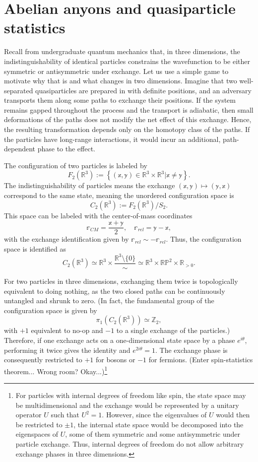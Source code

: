\documentclass{article}
\begin{document}
\section{Abelian anyons and quasiparticle statistics}
Recall from undergraduate quantum mechanics that, in three dimensions,
the indistinguishability of identical particles constrains the wavefunction
to be either symmetric or antisymmetric under exchange.
Let us use a simple game to motivate why that is and what changes in two dimensions.
Imagine that two well-separated quasiparticles are prepared in with definite positions,
and an adversary transports them along some paths to exchange their positions.
If the system remains gapped throughout the process and the transport is adiabatic,
then small deformations of the paths does not modify the net effect of this exchange.
Hence, the resulting transformation depends only on the homotopy class of the paths.
If the particles have long-range interactions, it would incur an additional,
path-dependent phase to the effect.

The configuration of two particles is labeled by
\[
    F_2(\mathbb{R}^3) := \left\{
        (\mathbb{x}, \mathbb{y}) \in \mathbb{R}^3 \times \mathbb{R}^3 |
        \mathbb{x} \neq \mathbb{y}
    \right\}.
\]
The indistinguishability of particles means the exchange
$(\mathbb{x}, \mathbb{y}) \mapsto (\mathbb{y}, \mathbb{x})$
correspond to the same state, meaning the unordered configuration space is
\[
    C_2(\mathbb{R}^3) := F_2(\mathbb{R}^3) / S_2.
\]
This space can be labeled with the center-of-mass coordinates
\[
    \mathbb{r}_{CM} = \frac{\mathbb{x} + \mathbb{y}}{2},\quad
    \mathbb{r}_{rel} = \mathbb{y} - \mathbb{x},
\]
with the exchange identification given by $\mathbb{r}_{rel} \sim -\mathbb{r}_{rel}$.
Thus, the configuration space is identified as
\[
    C_2(\mathbb{R}^3)
    \simeq \mathbb{R}^3 \times \frac{\mathbb{R}^3 \setminus \{0\}}{\sim}
    \simeq \mathbb{R}^3 \times \mathbb{RP}^2 \times \mathbb{R}_{>0}.
\]

For two particles in three dimensions, exchanging them twice is
topologically equivalent to doing nothing,
as the two closed paths can be continuously untangled and shrunk to zero.
(In fact, the fundamental group of the configuration space is given by
\[
    \pi_1(C_2(\mathbb{R}^3)) \simeq \mathbb{Z}_2,
\]
with $+1$ equivalent to no-op and $-1$ to a single exchange of the particles.)
Therefore, if one exchange acts on a one-dimensional state space
by a phase $e^{i\theta}$, performing it twice gives the identity and $e^{2i\theta}=1$.
The exchange phase is consequently restricted to $+1$ for bosons or $-1$ for fermions.
(Enter spin-statistics theorem... Wrong room? Okay...)\footnote{%
For particles with internal degrees of freedom like spin,
the state space may be multidimensional and the exchange would be represented
by a unitary operator $U$ such that $U^2 = 1$.
However, since the eigenvalues of $U$ would then be restricted to $\pm 1$,
the internal state space would be decomposed into the eigenspaces of $U$,
some of them symmetric and some antisymmetric under particle exchange.
Thus, internal degrees of freedom do not allow arbitrary exchange phases in three dimensions.
}
\end{document}
